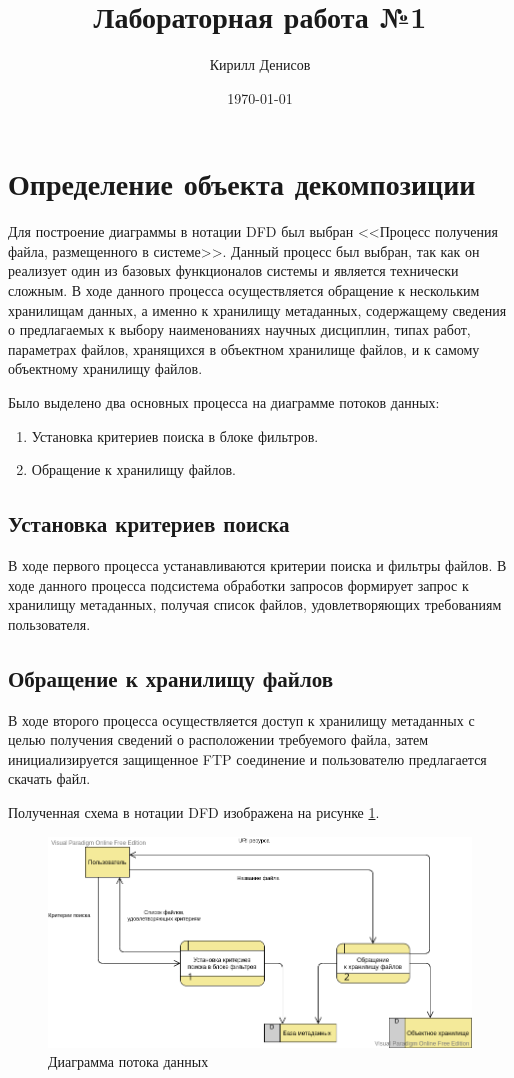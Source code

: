 \documentclass[a4paper,14pt]{extarticle}
\author{Кирилл Денисов}
\title{Лабораторная работа №1}
\date{\today}
\newcommand{\pathToCommonFolder}{/home/denilai/Documents/repos/latex/Common}
\begin{document}
	\thispagestyle{empty}
	
	\newpage
	\newpage
	
\normalsize

\section{Определение объекта декомпозиции}
Для построение диаграммы в нотации DFD был выбран <<Процесс получения файла, размещенного в системе>>. Данный процесс был выбран, так как он реализует один из базовых функционалов системы и является технически сложным. В ходе данного процесса осуществляется обращение к нескольким хранилищам данных, а именно к хранилищу метаданных, содержащему сведения о предлагаемых к выбору наименованиях научных дисциплин, типах работ, параметрах файлов, хранящихся в объектном хранилище файлов, и к самому объектному хранилищу файлов.


Было выделено два основных процесса на диаграмме потоков данных:
\begin{enumerate}
	\item Установка критериев
	поиска в блоке фильтров.
	\item Обращение
	к хранилищу файлов.
\end{enumerate}
\subsection{Установка критериев поиска}
В ходе первого процесса устанавливаются критерии поиска и фильтры файлов. В ходе данного процесса подсистема обработки запросов формирует запрос к хранилищу метаданных, получая список файлов, удовлетворяющих требованиям пользователя. 
\subsection{Обращение к хранилищу файлов}
В ходе второго процесса осуществляется доступ к хранилищу метаданных с целью получения сведений о расположении требуемого файла, затем инициализируется защищенное FTP соединение и пользователю предлагается скачать файл. 

Полученная схема в нотации DFD изображена на рисунке \ref{fig:dfd}.
\begin{figure}[h!]
	\centering
	\includegraphics[width=0.9\linewidth]{images/dfd}
	\caption{Диаграмма потока данных}
	\label{fig:dfd}
\end{figure}
\newpage
\end{document}
